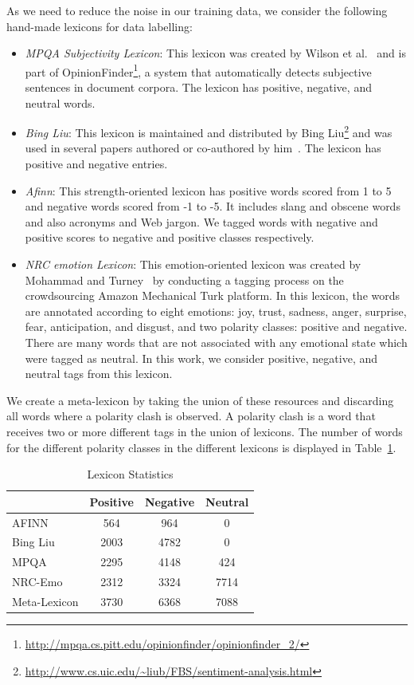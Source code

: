 \documentclass{sig-alternate}
\begin{document}
As we need to reduce the noise in our training data, we consider the following hand-made lexicons for data labelling:
\begin{itemize}
\item \emph{MPQA Subjectivity Lexicon}:  This lexicon was created by Wilson et al.~\cite{Wilson2005} and is part of OpinionFinder\footnote{\url{http://mpqa.cs.pitt.edu/opinionfinder/opinionfinder_2/}}, a system that automatically detects subjective sentences in document corpora. The lexicon has positive, negative, and neutral words. 
\item \emph{Bing Liu}: This lexicon is maintained and distributed by Bing
Liu\footnote{\url{http://www.cs.uic.edu/~liub/FBS/sentiment-analysis.html}} and
was used in several papers authored or co-authored by him~\cite{LiuBook}. The lexicon has positive and negative entries. 
\item \emph{Afinn}:  This strength-oriented lexicon \cite{Finn2011} has positive words scored from 1 to 5 and negative words scored from -1 to -5. It includes slang and obscene words and also acronyms and Web jargon. We tagged words with negative and positive scores to   negative and positive classes respectively.
\item \emph{NRC emotion Lexicon}: This emotion-oriented lexicon was created by Mohammad and Turney~\cite{Saaif2012}  by conducting a tagging process on the crowdsourcing Amazon Mechanical Turk platform. In this lexicon, the words are annotated according to eight emotions: joy, trust, sadness, anger, surprise, fear, anticipation, and disgust, and two polarity classes: positive and negative. There are many words that are not associated with any emotional state which were tagged as neutral. In this work, we consider positive, negative, and neutral tags from this lexicon. 
\end{itemize}

We create a meta-lexicon by taking the union of these resources and discarding all words where a polarity clash is observed. A polarity clash is a word that receives two or more different tags in the union of lexicons. The number of words for the different polarity classes in the different lexicons is displayed in Table~\ref{tab:lexstats}.   


\begin{table}[htbp]
\begin{center}
\begin{tabular}{l|c|c|c}
\hline
 & Positive & Negative & Neutral \\ \hline
AFINN & 564 & 964 & 0 \\ 
Bing Liu & 2003 & 4782 & 0 \\ 
MPQA & 2295 & 4148 & 424 \\ 
NRC-Emo & 2312 & 3324 & 7714 \\ \hline
Meta-Lexicon & 3730 & 6368 & 7088 \\ \hline
\end{tabular}
\end{center}
\caption{Lexicon Statistics}
\label{tab:lexstats}
\end{table}
\end{document}
